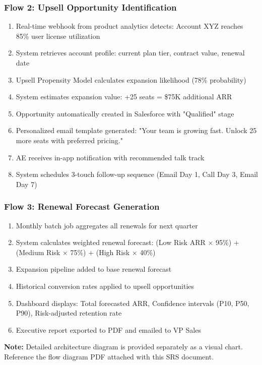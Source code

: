 \documentclass[12pt,a4paper]{article}
\begin{document}
\subsubsection{Flow 2: Upsell Opportunity Identification}
\begin{enumerate}
    \item Real-time webhook from product analytics detects: Account XYZ reaches 85\% user license utilization
    \item System retrieves account profile: current plan tier, contract value, renewal date
    \item Upsell Propensity Model calculates expansion likelihood (78\% probability)
    \item System estimates expansion value: +25 seats = \$75K additional ARR
    \item Opportunity automatically created in Salesforce with "Qualified" stage
    \item Personalized email template generated: "Your team is growing fast. Unlock 25 more seats with preferred pricing."
    \item AE receives in-app notification with recommended talk track
    \item System schedules 3-touch follow-up sequence (Email Day 1, Call Day 3, Email Day 7)
\end{enumerate}

\subsubsection{Flow 3: Renewal Forecast Generation}
\begin{enumerate}
    \item Monthly batch job aggregates all renewals for next quarter
    \item System calculates weighted renewal forecast: (Low Risk ARR $\times$ 95\%) + (Medium Risk $\times$ 75\%) + (High Risk $\times$ 40\%)
    \item Expansion pipeline added to base renewal forecast
    \item Historical conversion rates applied to upsell opportunities
    \item Dashboard displays: Total forecasted ARR, Confidence intervals (P10, P50, P90), Risk-adjusted retention rate
    \item Executive report exported to PDF and emailed to VP Sales
\end{enumerate}

\textbf{Note:} Detailed architecture diagram is provided separately as a visual chart. Reference the flow diagram PDF attached with this SRS document.
\end{document}
